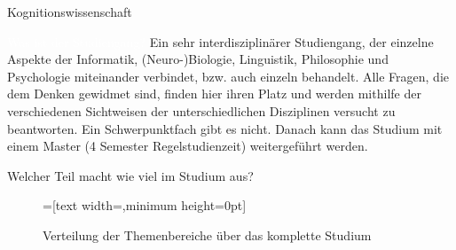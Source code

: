 


\begin{Huge}
    Kognitionswissenschaft
\end{Huge}

\begin{exampleblock}{\textcolor{white}{Was ist der Studiengang?}}
    Ein sehr interdisziplin\"arer Studiengang, der einzelne Aspekte der Informatik, (Neuro-)Biologie, Linguistik, Philosophie und Psychologie miteinander verbindet, bzw. auch einzeln behandelt. Alle Fragen, die dem Denken gewidmet sind, finden hier ihren Platz und werden mithilfe der verschiedenen Sichtweisen der unterschiedlichen Disziplinen versucht zu beantworten. Ein Schwerpunktfach gibt es nicht. Danach kann das Studium mit einem Master (4 Semester Regelstudienzeit) weitergef\"uhrt werden.
\end{exampleblock}

\begin{block}{Welcher Teil macht wie viel im Studium aus?}
    \begin{figure}[h!]
        \vspace{-10pt}
        \begin{minipage}{\linewidth}
            \centering
            =[text width={},minimum height=0pt]
        \end{minipage}
        \vspace{-20pt}
        \caption{Verteilung der Themenbereiche \"uber das komplette Studium}
    \end{figure}
\end{block}

